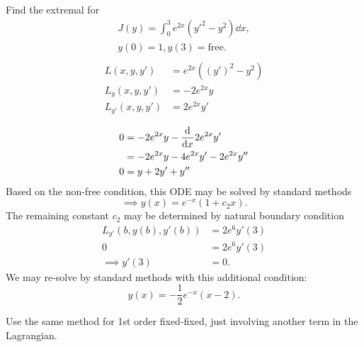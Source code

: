 {\tiny
Find the extremal for
\begin{equation}
  \label{eq:5a-problem}
  \begin{aligned}
    J(y) = \int_0^3 e^{2x}(y'^2-y^2)\dd{x}, \\
    y(0)=1, y(3)=\text{free}. \\
  \end{aligned}
\end{equation}
\begin{align*}
  L(x,y,y') &= e^{2 x} \left({\left(y'\right)}^2-y^2\right) \\
  L_y(x,y,y') &= -2 e^{2 x} y \\
  L_{y'}(x,y,y') &= 2 e^{2 x} y' \\
\end{align*}
\begin{equation}
\label{eq:5a-ode}
\begin{aligned}
  0 &= -2 e^{2 x} y - \frac{\mathrm{d}^{} {}}{\mathrm{d}{x}^{}}2 e^{2 x} y' \\
    &= -2 e^{2 x} y - 4e^{2x}y' - 2e^{2x}y'' \\
  0 &= y + 2y' + y''
\end{aligned}
\end{equation}
Based on the non-free condition, this ODE may be solved by standard methods
\begin{equation*}
  \implies y(x) = e^{-x}(1+c_2x).
\end{equation*}
The remaining constant $c_2$ may be determined by natural boundary condition
\begin{align*}
  L_{y'}(b,y(b),y'(b)) &= 2 e^{6} y'(3) \\
  0 &= 2e^{6}y'(3) \\
  \implies y'(3) &= 0.
\end{align*}
We may re-solve by standard methods with this additional
condition:
\begin{equation*}
  \boxed{y(x) = -\frac{1}{2} e^{-x} (x-2).}
\end{equation*}
}

\item[2nd Order Fixed-Fixed] Use the same method for 1st order fixed-fixed, just
  involving another term in the Lagrangian.

